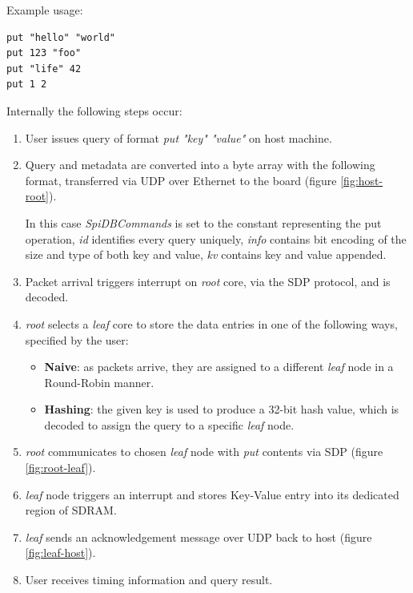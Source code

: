 Example usage:
\begin{lstlisting}
put "hello" "world"
put 123 "foo"
put "life" 42
put 1 2
\end{lstlisting}
 
Internally the following steps occur:
\begin{enumerate}
\item User issues query of format \textit{put "key" "value"} on host machine.
\item Query and metadata are converted into a byte array with the following format, transferred via UDP over Ethernet to the board (figure \ref{fig:host-root}).

In this case \textit{SpiDBCommands} is set to the constant representing the put operation, \textit{id} identifies every query uniquely, \textit{info} contains bit encoding of the size and type of both key and value, \textit{k\textunderscore v} contains key and value appended.
\item Packet arrival triggers interrupt on \textit{root} core, via the SDP protocol, and is decoded.
\item \textit{root} selects a \textit{leaf} core to store the data entries in one of the following ways, specified by the user:
\begin{itemize}
	\item \textbf{Naive}: as packets arrive, they are assigned to a different \textit{leaf} node in a Round-Robin manner.
	\item \textbf{Hashing}: the given key is used to produce a 32-bit hash value, which is decoded to assign the query to a specific \textit{leaf} node.
\end{itemize}
\item \textit{root} communicates to chosen \textit{leaf} node with \textit{put} contents via SDP (figure \ref{fig:root-leaf}).
\item \textit{leaf} node triggers an interrupt and stores Key-Value entry into its dedicated region of SDRAM.
\item \textit{leaf} sends an acknowledgement message over UDP back to host (figure \ref{fig:leaf-host}).
\item User receives timing information and query result.
\end{enumerate}

